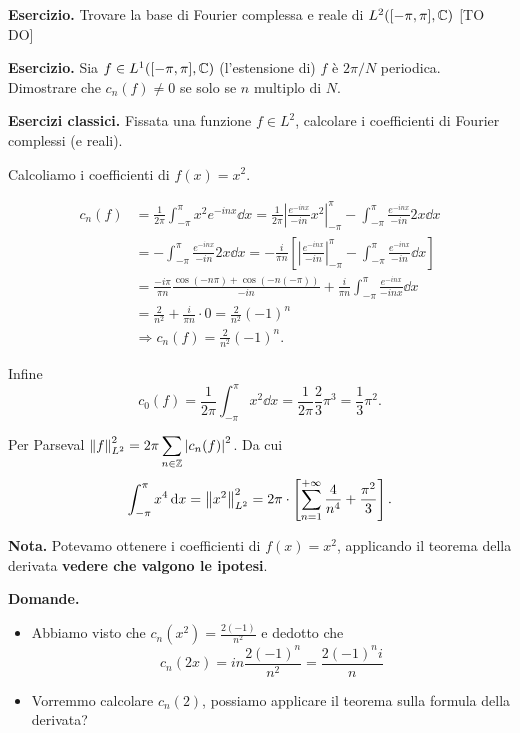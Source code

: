 \textbf{Esercizio.} Trovare la base di Fourier complessa e reale di $L^2([-\pi,\pi], \mathbb C) $ [TO DO]


\textbf{Esercizio.} Sia $f \in L^1([-\pi,\pi], \mathbb C) $ (l'estensione di) $f$ è $2\pi / N$ periodica. Dimostrare che $c_n(f) \neq 0$ se solo se $n$ multiplo di $N$.

\textbf{Esercizi classici.} Fissata una funzione $f \in L^2$, calcolare i coefficienti di Fourier complessi (e reali).

Calcoliamo i coefficienti di $f(x) = x^2$.

\begin{align*}
c_n(f) & = \frac{1}{2\pi} \int_{-\pi}^\pi x^2 e^{-inx} \dd x = \frac{1}{2\pi} \left| \frac{e^{-inx}}{-in} x^2 \right|_{-\pi}^\pi - \int_{-\pi}^\pi \frac{e^{-inx}}{-in} 2x \dd x \\
& = - \int_{-\pi}^\pi \frac{e^{-inx}}{-in} 2x \dd x = -\frac{i}{\pi n} \left[ \left| \frac{e^{-inx}}{-in} \right|_{-\pi}^\pi - \int_{-\pi}^\pi \frac{e^{-inx}}{-in} \dd x  \right] \\
& = \frac{-i \pi}{\pi n} \frac{\cos(-n\pi) + \cos(-n (-\pi))}{-in} + \frac{i}{\pi n} \int_{-\pi}^\pi \frac{e^{-inx}}{-inx} \dd x \\
& = \frac{2}{n^2} + \frac{i}{\pi n} \cdot 0 = \frac{2}{n^2} (-1)^n \\
& \Longrightarrow c_n(f) = \frac{2}{n^2} (-1)^n.
\end{align*}

Infine
%
$$
c_0(f) = \frac{1}{2\pi} \int_{-\pi}^\pi x^2 \dd x = \frac{1}{2\pi} \frac{2}{3} \pi^3 = \frac{1}{3} \pi^2.
$$
%

Per Parseval $\displaystyle \left\lVert f \right\rVert_{L^2}^2 = 2\pi \sum_{n \in \mathbb Z} \left| c_n(f) \right|^2$.
Da cui
%
$$
\int_{-\pi}^\pi x^4 \,\mathrm{d} x = \left\lVert x^2 \right\rVert_{L^2}^2 = 2\pi \cdot \left[ \sum_{n=1}^{+\infty} \frac{4}{n^4} + \frac{\pi^2}{3}  \right].
$$
%

\textbf{Nota.} Potevamo ottenere i coefficienti di $f(x) = x^2$, applicando il teorema della derivata \textbf{vedere che valgono le ipotesi}.

\textbf{Domande.}
\begin{itemize}

\item Abbiamo visto che $c_n(x^2) = \frac{2 (-1)}{n^2}$ e dedotto che 
%
$$
c_n(2x) = in \frac{2(-1)^n}{n^2} = \frac{2(-1)^n i}{n}
$$
%

\item Vorremmo calcolare $c_n(2)$, possiamo applicare il teorema sulla formula della derivata?

\end{itemize}

